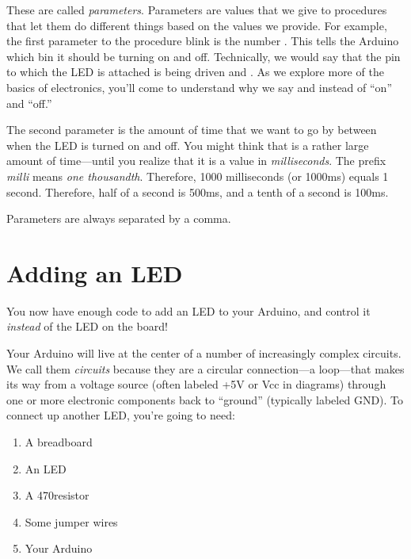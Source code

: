 These are called {\em parameters}. Parameters are values that we give to procedures that let them do different things based on the values we provide. For example, the first parameter to the procedure {\procname blink} is the number {}. This tells the Arduino which bin it should be turning on and off. Technically, we would say that the pin to which the LED is attached is being driven \HIGH and \LOW. As we explore more of the basics of electronics, you'll come to understand why we say \HIGH and \LOW instead of ``on'' and ``off.''

The second parameter is the amount of time that we want to go by between when the LED is turned on and off. You might think that {} is a rather large amount of time---until you realize that it is a value in {\em milliseconds}. The prefix {\em milli} means {\em one thousandth}. Therefore, 1000 milliseconds (or 1000ms) equals 1 second. Therefore, half of a second is 500ms, and a tenth of a second is 100ms. 

Parameters are always separated by a comma.

\section{Adding an LED}
You now have enough \plumbing code to add an LED to your Arduino, and control it {\em instead} of the LED on the board!


Your Arduino will live at the center of a number of increasingly complex circuits. We call them {\em circuits} because they are a circular connection---a loop---that makes its way from a voltage source (often labeled {\code +5V} or {\code Vcc} in diagrams) through one or more electronic components back to ``ground'' (typically labeled {\code GND}). To connect up another LED, you're going to need:

\begin{enumerate}
	\item A breadboard
	\item An LED
	\item A 470\ohm resistor
	\item Some jumper wires
	\item Your Arduino
\end{enumerate}

